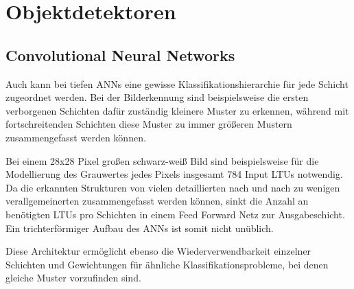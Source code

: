 \section{Objektdetektoren}

\subsection{Convolutional Neural Networks}

Auch kann bei tiefen ANNs eine gewisse Klassifikationshierarchie für jede Schicht zugeordnet werden. Bei der Bilderkennung sind beispielsweise die ersten verborgenen Schichten dafür zuständig kleinere Muster zu erkennen, während mit fortschreitenden Schichten diese Muster zu immer größeren Mustern zusammengefasst werden können. \cite[S. 271 f.]{AurelienGeron.2018}

Bei einem 28x28 Pixel großen schwarz-weiß Bild sind beispielsweise für die Modellierung des Grauwertes jedes Pixels insgesamt 784 Input LTUs notwendig. Da die erkannten Strukturen von vielen detaillierten nach und nach zu wenigen verallgemeinerten zusammengefasst werden können, sinkt die Anzahl an benötigten LTUs pro Schichten in einem Feed Forward Netz zur Ausgabeschicht. Ein trichterförmiger Aufbau des ANNs ist somit nicht unüblich. \cite[S. 271 f.]{AurelienGeron.2018}

Diese Architektur ermöglicht ebenso die Wiederverwendbarkeit einzelner Schichten und Gewichtungen für ähnliche Klassifikationsprobleme, bei denen gleiche Muster vorzufinden sind. \cite[S. 271]{AurelienGeron.2018}